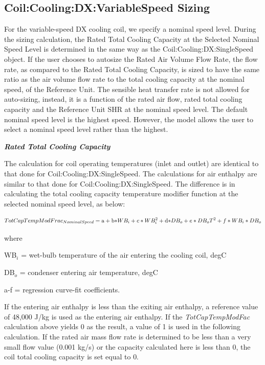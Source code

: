 \subsection{Coil:Cooling:DX:VariableSpeed Sizing}\label{coilcoolingdxvariablespeed-sizing}

For the variable-speed DX cooling coil, we specify a nominal speed level. During the sizing calculation, the Rated Total Cooling Capacity at the Selected Nominal Speed Level is determined in the same way as the Coil:Cooling:DX:SingleSpeed object. If the user chooses to autosize the Rated Air Volume Flow Rate, the flow rate, as compared to the Rated Total Cooling Capacity, is sized to have the same ratio as the air volume flow rate to the total cooling capacity at the nominal speed, of the Reference Unit. The sensible heat transfer rate is not allowed for auto-sizing, instead, it is a function of the rated air flow, rated total cooling capacity and the Reference Unit SHR at the nominal speed level. The default nominal speed level is the highest speed. However, the model allows the user to select a nominal speed level rather than the highest.

\textbf{\emph{Rated Total Cooling Capacity}}

The calculation for coil operating temperatures (inlet and outlet) are identical to that done for Coil:Cooling:DX:SingleSpeed. The calculations for air enthalpy are similar to that done for Coil:Cooling:DX:SingleSpeed\emph{.} The difference is in calculating the total cooling capacity temperature modifier function at the selected nominal speed level, as below:

\begin{equation}
TotCapTempModFra{c_{NominalSpeed}} = {\rm{a}} + {\rm{b*}}W{B_i} + c*WB_i^2 + {\rm{d*}}D{B_o} + e*D{B_o}{T^2} + f*W{B_i}*D{B_o}
\end{equation}

where

WB\(_{i}\) = wet-bulb temperature of the air entering the cooling coil, degC

DB\(_{o}\) = condenser entering air temperature, degC

a-f = regression curve-fit coefficients.

If the entering air enthalpy is less than the exiting air enthalpy, a reference value of 48,000 J/kg is used as the entering air enthalpy. If the \emph{TotCapTempModFac} calculation above yields 0 as the result, a value of 1 is used in the following calculation. If the rated air mass flow rate is determined to be less than a very small flow value (0.001 kg/s) or the capacity calculated here is less than 0, the coil total cooling capacity is set equal to 0.

